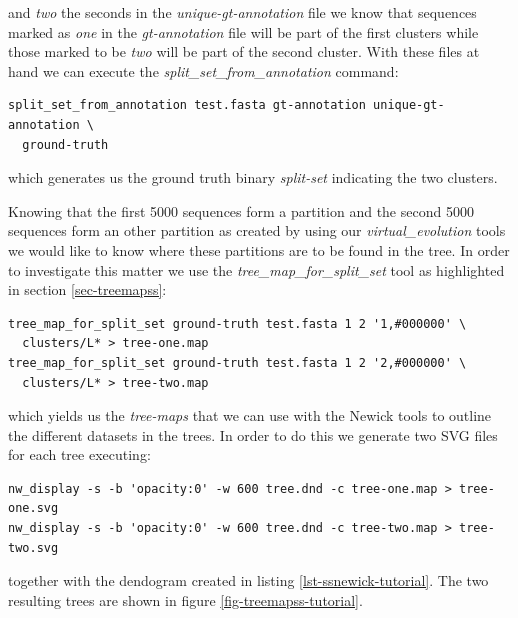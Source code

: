 and \emph{two} the seconds in the \emph{unique-gt-annotation} file we
know that sequences marked as \emph{one} in the \emph{gt-annotation}
file will be part of the first clusters while those marked to be
\emph{two} will be part of the second cluster. With these files at
hand we can execute the \emph{split\_set\_from\_annotation} command:
\begin{lstlisting}
split_set_from_annotation test.fasta gt-annotation unique-gt-annotation \
  ground-truth
\end{lstlisting}
which generates us the ground truth binary \emph{split-set} indicating
the two clusters.

Knowing that the first 5000 sequences
form a partition and the second 5000 sequences form an other partition
as created by using our \emph{virtual\_evolution} tools we would like
to know where these partitions are to be found in the tree.
In order to investigate this matter we use the
\emph{tree\_map\_for\_split\_set} tool
as highlighted in section \ref{sec-treemapss}:
\begin{lstlisting}
tree_map_for_split_set ground-truth test.fasta 1 2 '1,#000000' \
  clusters/L* > tree-one.map
tree_map_for_split_set ground-truth test.fasta 1 2 '2,#000000' \
  clusters/L* > tree-two.map
\end{lstlisting}
which yields us the \emph{tree-maps} that we can use with the Newick
tools \cite{newick_tools} to outline the different
datasets in the trees. In order to do this we generate two SVG files
for each tree executing:
\begin{lstlisting}
nw_display -s -b 'opacity:0' -w 600 tree.dnd -c tree-one.map > tree-one.svg
nw_display -s -b 'opacity:0' -w 600 tree.dnd -c tree-two.map > tree-two.svg
\end{lstlisting}
together with the dendogram created in listing \ref{lst-ssnewick-tutorial}.
The two resulting trees are shown in figure \ref{fig-treemapss-tutorial}.
